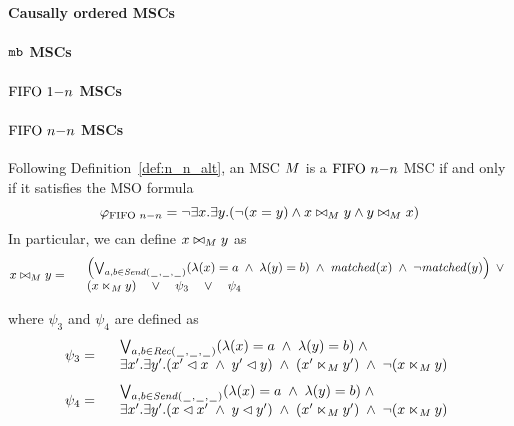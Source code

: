 \paragraph*{Causally ordered MSCs}


\paragraph*{$\mathtt{mb}$ MSCs}


\paragraph*{$\text{FIFO } 1\mathsf{-}n$ MSCs}


\paragraph*{$\text{FIFO } n\mathsf{-}n$ MSCs}

Following Definition~\ref{def:n_n_alt}, an MSC $M$ is a $\text{FIFO } n\mathsf{-}n$ MSC if and only if it satisfies the MSO formula
\[
	\varphi_{\text{FIFO } n\mathsf{-}n} = \neg \exists x.\exists y.(\neg (x = y) \wedge x \bowtie_M y \wedge y \bowtie_M x)
\]
In particular, we can define $x \bowtie_M y$ as
\[
	x \bowtie_M y =
	\begin{array}{rl}
	& \left(
		\bigvee_{\substack{a,b \in {\mathit{Send}(\hspace{0.1em}\underline{\hspace{0.5em}}\hspace{0.1em},\hspace{0.1em}\underline{\hspace{0.5em}}\hspace{0.1em},\hspace{0.1em}\underline{\hspace{0.5em}}\hspace{0.1em})}}}
		(\lambda(x) = a \;\wedge\; \lambda(y) = b)
		\;\wedge\; \mathit{matched}(x) \;\wedge\; \neg \mathit{matched}(y)
	\right) \;\vee\\
	& (x \ltimes_M y) \quad \vee \quad \psi_3 \quad \vee \quad \psi_4\\
	\end{array}
\]

\noindent where $\psi_3$ and $\psi_4$ are defined as 
\[
	\psi_3 =
	\begin{array}{rl}
		& \bigvee_{\substack{a,b \in {\mathit{Rec}(\hspace{0.1em}\underline{\hspace{0.5em}}\hspace{0.1em},\hspace{0.1em}\underline{\hspace{0.5em}}\hspace{0.1em},\hspace{0.1em}\underline{\hspace{0.5em}}\hspace{0.1em})}}}
		  (\lambda(x) = a \;\wedge\; \lambda(y) = b)
		  \;\wedge\; \\
		& \exists x'.\exists y'.(x' \lhd x \;\wedge\; y' \lhd y) \;\wedge\; (x' \ltimes_M y') \;\wedge\; \neg(x \ltimes_M y)\\
	\end{array}
\]
\[
	\psi_4 =
	\begin{array}{rl}
		& \bigvee_{\substack{a,b \in {\mathit{Send}(\hspace{0.1em}\underline{\hspace{0.5em}}\hspace{0.1em},\hspace{0.1em}\underline{\hspace{0.5em}}\hspace{0.1em},\hspace{0.1em}\underline{\hspace{0.5em}}\hspace{0.1em})}}}
		  (\lambda(x) = a \;\wedge\; \lambda(y) = b)
		  \;\wedge\; \\
		& \exists x'.\exists y'.(x \lhd x' \;\wedge\; y \lhd y') \;\wedge\; (x' \ltimes_M y') \;\wedge\; \neg(x \ltimes_M y)\\
	\end{array}
\]

